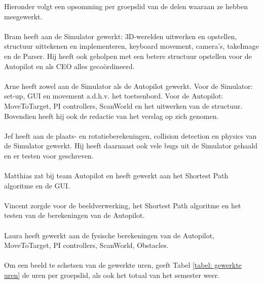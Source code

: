 \documentclass[]{penoverslag}
\begin{document}
Hieronder volgt een opsomming per groepslid van de delen waaraan ze hebben meegewerkt.
\\
\\
Bram heeft aan de Simulator gewerkt: 3D-werelden uitwerken en opstellen, structuur uittekenen en implementeren, keyboard movement, camera's, takeImage en de Parser. Hij heeft ook geholpen met een betere structuur opstellen voor de Autopilot en als CEO alles geco\"ordineerd.
\\
\\
Arne heeft zowel aan de Simulator als de Autopilot gewerkt. Voor de Simulator: set-up, GUI en movement a.d.h.v. het toetsenbord. Voor de Autopilot: MoveToTarget, PI controllers, ScanWorld en het uitwerken van de structuur. Bovendien heeft hij ook de redactie van het verslag op zich genomen.
\\
\\
Jef heeft aan de plaats- en rotatieberekeningen, collision detection en physics van de Simulator gewerkt. Hij heeft daarnaast ook vele bugs uit de Simulator gehaald en er testen voor geschreven.
\\
\\
Matthias zat bij team Autopilot en heeft gewerkt aan het Shortest Path algoritme en de GUI.
\\
\\
Vincent zorgde voor de beeldverwerking, het Shortest Path algoritme en het testen van de berekeningen van de Autopilot.
\\
\\
Laura heeft gewerkt aan de fysische berekeningen van de Autopilot, MoveToTarget, PI controllers, ScanWorld, Obstacles.
\\
\\
Om een beeld te schetsen van de gewerkte uren, geeft Tabel \ref{tabel: gewerkte uren} de uren per groepslid, als ook het totaal van het semester weer.
\\
\\
\end{document}
